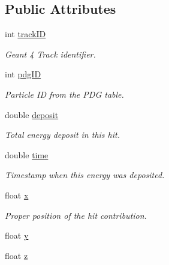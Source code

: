 \subsection*{Public Attributes}
\begin{DoxyCompactItemize}
\item 
int \hyperlink{class_d_d4hep_1_1_simulation_1_1_geant4_hit_data_1_1_monte_carlo_contrib_a80a8546851d931b3b39e690a3bc1b3d8}{track\+ID}
\begin{DoxyCompactList}\small\item\em Geant 4 Track identifier. \end{DoxyCompactList}\item 
int \hyperlink{class_d_d4hep_1_1_simulation_1_1_geant4_hit_data_1_1_monte_carlo_contrib_a7b755dfa6639f3cc02cd4696719d0580}{pdg\+ID}
\begin{DoxyCompactList}\small\item\em Particle ID from the P\+DG table. \end{DoxyCompactList}\item 
double \hyperlink{class_d_d4hep_1_1_simulation_1_1_geant4_hit_data_1_1_monte_carlo_contrib_a34177a48fce1f52d1b58d6ab47e1cacc}{deposit}
\begin{DoxyCompactList}\small\item\em Total energy deposit in this hit. \end{DoxyCompactList}\item 
double \hyperlink{class_d_d4hep_1_1_simulation_1_1_geant4_hit_data_1_1_monte_carlo_contrib_a2d1cbbdb9da1af65acb58ef97fe10277}{time}
\begin{DoxyCompactList}\small\item\em Timestamp when this energy was deposited. \end{DoxyCompactList}\item 
float \hyperlink{class_d_d4hep_1_1_simulation_1_1_geant4_hit_data_1_1_monte_carlo_contrib_af10634172fe6990ae8f588ba109c1c0f}{x}
\begin{DoxyCompactList}\small\item\em Proper position of the hit contribution. \end{DoxyCompactList}\item 
float \hyperlink{class_d_d4hep_1_1_simulation_1_1_geant4_hit_data_1_1_monte_carlo_contrib_afc4f5cb38a61ece64df14416ae637cbb}{y}
\item 
float \hyperlink{class_d_d4hep_1_1_simulation_1_1_geant4_hit_data_1_1_monte_carlo_contrib_ad56f9cc8b369b718c9f85a17bfe43054}{z}
\end{DoxyCompactItemize}


